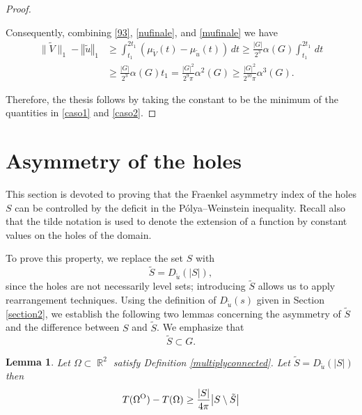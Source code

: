 \documentclass[oneside,a4paper,11pt,notitlepage]{article}
\newcommand{\abs}[1]{{\left|#1\right|}}
\newcommand{\norma}[1]{{\left\Vert#1\right\Vert}}
\theoremstyle{definition}
\theoremstyle{plain}
\newtheorem{lemma}[theorem]{Lemma}
\theoremstyle{definition}
\DeclareMathOperator{\R}{\mathbb{R}}
\newcommand{\OO}{\text{\normalfont  O}}
\begin{document}
\begin{proof}
\begin{itemize}
        Consequently, combining \eqref{93}, \eqref{nufinale}, and \eqref{mufinale} we have
        \begin{equation}\label{caso2}
        \begin{aligned}
            {\lVert\tilde V\rVert_1}-{\norma{\tilde u}_1}&\geq \int_{t_1}^{2t_1} \left(\mu_{\tilde V}(t)-\mu_{\tilde u}(t)\right)\, dt\geq \frac{\abs{G}}{2^3} \alpha(G)\int_{t_1}^{2t_1} \, dt\\&\geq 
            \frac{\abs{G}}{2^3} \alpha(G)t_1 = 
            \frac{\abs{G}^2}{2^9\pi} \alpha^2(G) 
            \geq
            \frac{\abs{G}^2}{2^{10}\pi} \alpha^3(G).
        \end{aligned}
        \end{equation}   
    \end{itemize}
    Therefore, the thesis follows by taking the constant to be the minimum of the quantities in \eqref{caso1} and \eqref{caso2}.
\end{proof}

\section{Asymmetry of the holes}\label{section5}This section is devoted to proving that the Fraenkel asymmetry index of the holes $S$ can be controlled by the deficit in the P\'olya–Weinstein inequality. Recall also that the tilde notation is used to denote the extension of a function by constant values on the holes of the domain.

To prove this property, we replace the set $S$ with 
\[
\tilde S = D_{\tilde u}(|S|),
\] 
 since the holes are not necessarily level sets; introducing $\tilde S$ allows us to apply rearrangement techniques. Using the definition of $D_{\tilde u}(s)$ given in Section \ref{section2}, we establish the following two lemmas concerning  the asymmetry of $\tilde S$ and  the difference between $S$ and $\tilde S$. We emphasize that 
\[
\tilde S \subset G.
\]



\begin{lemma}\label{lemma5.1}
	Let $\Omega\subset\R^2$ satisfy Definition \ref{multiplyconnected}. Let $\tilde{S}=D_{\tilde u}(\abs{S})$ then 
\begin{equation*}
		T(\Omega^\OO)-T(\Omega) \geq \frac{\abs{S}}{4\pi}\abs{S\setminus\tilde{S}}
\end{equation*}
	
\end{lemma}
\end{document}
